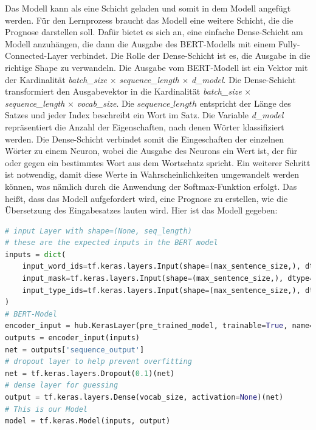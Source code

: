 Das Modell kann als eine Schicht geladen und somit in dem Modell angefügt werden. Für den Lernprozess braucht das Modell eine weitere Schicht, die die Prognose darstellen soll. Dafür bietet es sich an, eine einfache Dense-Schicht am Modell anzuhängen, die dann die Ausgabe des BERT-Modells mit einem Fully-Connected-Layer verbindet. Die Rolle der Dense-Schicht ist es, die Ausgabe in die richtige Shape zu verwandeln. Die Ausgabe vom BERT-Modell ist ein Vektor mit der Kardinalität \textit{batch\_size} $\times$ \textit{sequence\_length} $\times$ \textit{d\_model}. Die Dense-Schicht transformiert den Ausgabevektor in die Kardinalität \textit{batch\_size} $\times$ \textit{sequence\_length} $\times$ \textit{vocab\_size}. Die $sequence\_length$ entspricht der Länge des Satzes und jeder Index beschreibt ein Wort im Satz. Die Variable \textit{d\_model} repräsentiert die Anzahl der Eigenschaften, nach denen Wörter klassifiziert werden. Die Dense-Schicht verbindet somit die Eingeschaften der einzelnen Wörter zu einem Neuron, wobei die Ausgabe des Neurons ein Wert ist, der für oder gegen ein bestimmtes Wort aus dem Wortschatz spricht. Ein weiterer Schritt ist notwendig, damit diese Werte in Wahrscheinlichkeiten umgewandelt werden können, was nämlich durch die Anwendung der Softmax-Funktion erfolgt. Das heißt, dass das Modell aufgefordert wird, eine Prognose zu erstellen, wie die Übersetzung des Eingabesatzes lauten wird. Hier ist das Modell gegeben:

\begin{lstlisting}[language=Python, label=BERT_Definition, caption={Definition des BERT-Modells zur Anpassung}]
# input Layer with shape=(None, seq_length)
# these are the expected inputs in the BERT model
inputs = dict(
	input_word_ids=tf.keras.layers.Input(shape=(max_sentence_size,), dtype=tf.int32),
	input_mask=tf.keras.layers.Input(shape=(max_sentence_size,), dtype=tf.int32),
	input_type_ids=tf.keras.layers.Input(shape=(max_sentence_size,), dtype=tf.int32)
)
# BERT-Model
encoder_input = hub.KerasLayer(pre_trained_model, trainable=True, name="BERT_Encoder")
outputs = encoder_input(inputs)
net = outputs['sequence_output']
# dropout layer to help prevent overfitting
net = tf.keras.layers.Dropout(0.1)(net)
# dense layer for guessing
output = tf.keras.layers.Dense(vocab_size, activation=None)(net)
# This is our Model
model = tf.keras.Model(inputs, output)
\end{lstlisting}

